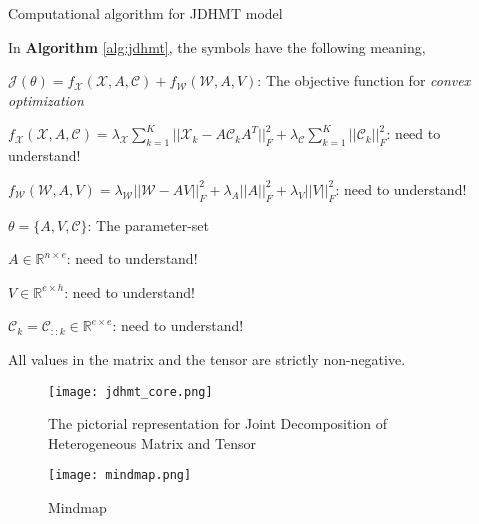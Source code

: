 \begin{sloppypar*}
\begin{algorithm}

        \caption{Computational algorithm for JDHMT model}\label{alg:jdhmt}
    \end{algorithm}

    \noindent In \textbf{Algorithm} \ref{alg:jdhmt}, the symbols have the following meaning,

    $\mathcal{J}(\theta) = f_{\mathcal{X}}(\mathcal{X}, A, \mathcal{C}) + f_{\mathcal{W}}(\mathcal{W}, A, V)$: 
    The objective function for \textit{convex optimization}

    $f_{\mathcal{X}}(\mathcal{X}, A, \mathcal{C}) = \lambda_{\mathcal{X}} \sum_{k=1}^{K} || \mathcal{X}_k - A \mathcal{C}_k A^T ||_{F}^{2} + \lambda_{\mathcal{C}} \sum_{k=1}^{K} || \mathcal{C}_k ||_{F}^{2}$:
    need to understand!

    $f_{\mathcal{W}}(\mathcal{W}, A, V) = \lambda_{\mathcal{W}} || \mathcal{W} - A V ||_{F}^{2} + \lambda_A || A ||_{F}^{2} + \lambda_V || V ||_{F}^{2}$:
    need to understand!
    
    $\theta = \{A, V, \mathcal{C}\}$: The parameter-set

    $A \in \mathbb{R}^{n \times e}$: need to understand!

    $V \in \mathbb{R}^{e \times h}$: need to understand!

    $\mathcal{C}_k = \mathcal{C}_{::k} \in \mathbb{R}^{e \times e}$: need to understand!

    \noindent All values in the matrix and the tensor are strictly non-negative.

    \begin{figure}
        \centering
        \texttt{[image: jdhmt\_core.png]}
        \caption{The pictorial representation for Joint Decomposition of
        Heterogeneous Matrix and Tensor}
        \label{fig:logic}
    \end{figure}

    \begin{figure}
        \centering
        \texttt{[image: mindmap.png]}
        \caption{Mindmap}
        \label{fig:mindmap}
    \end{figure}
    
    

\end{sloppypar*}
